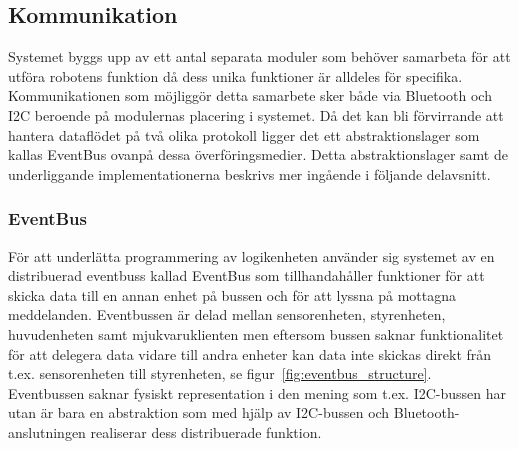 \documentclass{article}
\begin{document}
\subsection{Kommunikation}
Systemet byggs upp av ett antal separata moduler som behöver samarbeta för att utföra robotens funktion då dess unika funktioner är alldeles för specifika. Kommunikationen som möjliggör detta samarbete sker både via Bluetooth och I2C beroende på modulernas placering i systemet. Då det kan bli förvirrande att hantera dataflödet på två olika protokoll ligger det ett abstraktionslager som kallas EventBus ovanpå dessa överföringsmedier. Detta abstraktionslager samt de underliggande implementationerna beskrivs mer ingående i följande delavsnitt. 

\subsubsection{EventBus}
\label{sec:eventbus}
För att underlätta programmering av logikenheten använder sig systemet av en distribuerad eventbuss kallad EventBus som tillhandahåller funktioner för att skicka data till en annan enhet på bussen och för att lyssna på mottagna meddelanden. Eventbussen är delad mellan sensorenheten, styrenheten, huvudenheten samt mjukvaruklienten men eftersom bussen saknar funktionalitet för att delegera data vidare till andra enheter kan data inte skickas direkt från t.ex. sensorenheten till styrenheten, se figur~\ref{fig:eventbus_structure}. Eventbussen saknar fysiskt representation i den mening som t.ex. I2C-bussen har utan är bara en abstraktion som med hjälp av I2C-bussen och Bluetooth-anslutningen realiserar dess distribuerade funktion.
\end{document}
